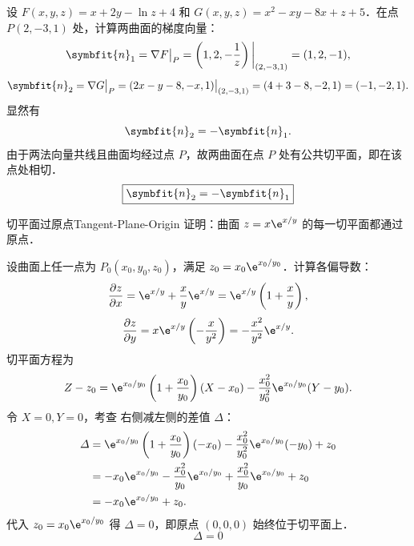 \begin{myproof}
    设 $F(x, y, z) = x + 2y - \ln z + 4$ 和 $G(x, y, z) = x^2 - xy - 8x + z + 5$．在点 $P(2, -3, 1)$ 处，计算两曲面的梯度向量：
    \begin{equation}
        \symbfit{n}_1 = \nabla F \big|_P = \left( 1, 2, -\frac{1}{z} \right) \bigg|_{(2, -3, 1)} = (1, 2, -1),
    \end{equation}
    \begin{equation}
        \symbfit{n}_2 = \nabla G \big|_P = (2x - y - 8, -x, 1) \big|_{(2, -3, 1)} = (4 + 3 - 8, -2, 1) = (-1, -2, 1).
    \end{equation}
    显然有
    \begin{equation}
        \symbfit{n}_2 = - \symbfit{n}_1.
    \end{equation}
    由于两法向量共线且曲面均经过点 $P$，故两曲面在点 $P$ 处有公共切平面，即在该点处相切．
    \begin{equation}
        \boxed{\symbfit{n}_2 = -\symbfit{n}_1}
    \end{equation}
\end{myproof}


\begin{problem}{切平面过原点}{Tangent-Plane-Origin}
    证明：曲面 $z = x \e^{x/y}$ 的每一切平面都通过原点．
\end{problem}

\begin{myproof}
    设曲面上任一点为 $P_0(x_0, y_0, z_0)$，满足 $z_0 = x_0 \e^{x_0/y_0}$．计算各偏导数：
    \begin{equation}
        \frac{\partial z}{\partial x} = \e^{x/y} + \frac{x}{y} \e^{x/y} = \e^{x/y} \left( 1 + \frac{x}{y} \right),
    \end{equation}
    \begin{equation}
        \frac{\partial z}{\partial y} = x \e^{x/y} \left( -\frac{x}{y^2} \right) = -\frac{x^2}{y^2} \e^{x/y}.
    \end{equation}
    切平面方程为
    \begin{equation}\label{eq:tangent-plane-eq}
        Z - z_0 = \e^{x_0/y_0} \left( 1 + \frac{x_0}{y_0} \right) (X - x_0) - \frac{x_0^2}{y_0^2} \e^{x_0/y_0} (Y - y_0).
    \end{equation}
    令 $X=0, Y=0$，考查  右侧减左侧的差值 $\varDelta$：
    \begin{equation}
        \begin{aligned}
            \varDelta & = \e^{x_0/y_0} \left( 1 + \frac{x_0}{y_0} \right) (-x_0) - \frac{x_0^2}{y_0^2} \e^{x_0/y_0} (-y_0) + z_0 \\
                      & = -x_0 \e^{x_0/y_0} - \frac{x_0^2}{y_0} \e^{x_0/y_0} + \frac{x_0^2}{y_0} \e^{x_0/y_0} + z_0              \\
                      & = -x_0 \e^{x_0/y_0} + z_0.
        \end{aligned}
    \end{equation}
    代入 $z_0 = x_0 \e^{x_0/y_0}$ 得 $\varDelta = 0$，即原点 $(0, 0, 0)$ 始终位于切平面上．
    \begin{equation}
        \boxed{\varDelta = 0}
    \end{equation}
\end{myproof}


